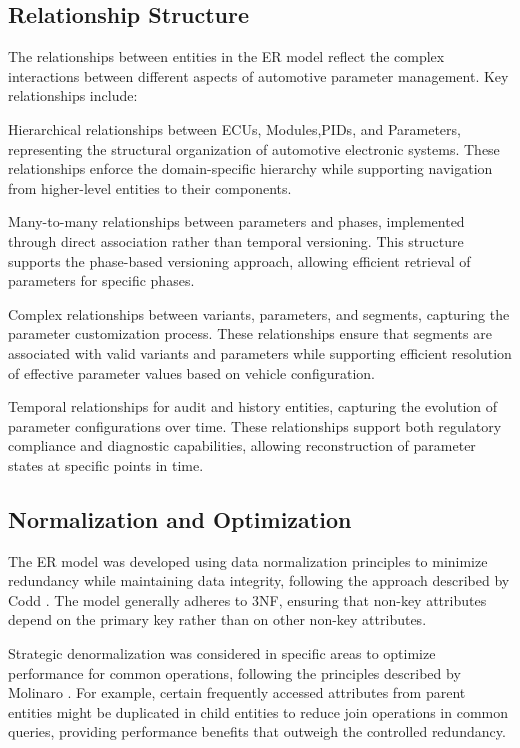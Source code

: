 \subsection{Relationship Structure}
\label{subsec:relationship-structure}

The relationships between entities in the \ac{ER} model reflect the complex interactions between different aspects of automotive parameter management. Key relationships include:

Hierarchical relationships between \acp{ECU}, Modules,\acp{PID}, and Parameters, representing the structural organization of automotive electronic systems. These relationships enforce the domain-specific hierarchy while supporting navigation from higher-level entities to their components.

Many-to-many relationships between parameters and phases, implemented through direct association rather than temporal versioning. This structure supports the phase-based versioning approach, allowing efficient retrieval of parameters for specific phases.

Complex relationships between variants, parameters, and segments, capturing the parameter customization process. These relationships ensure that segments are associated with valid variants and parameters while supporting efficient resolution of effective parameter values based on vehicle configuration.

Temporal relationships for audit and history entities, capturing the evolution of parameter configurations over time. These relationships support both regulatory compliance and diagnostic capabilities, allowing reconstruction of parameter states at specific points in time.

\subsection{Normalization and Optimization}
\label{subsec:normalization-optimization}

The \ac{ER} model was developed using data normalization principles to minimize redundancy while maintaining data integrity, following the approach described by Codd \cite{codd1970relational}. The model generally adheres to \ac{3NF}, ensuring that non-key attributes depend on the primary key rather than on other non-key attributes.

Strategic denormalization was considered in specific areas to optimize performance for common operations, following the principles described by Molinaro \cite{molinaro2005sql}. For example, certain frequently accessed attributes from parent entities might be duplicated in child entities to reduce join operations in common queries, providing performance benefits that outweigh the controlled redundancy.


